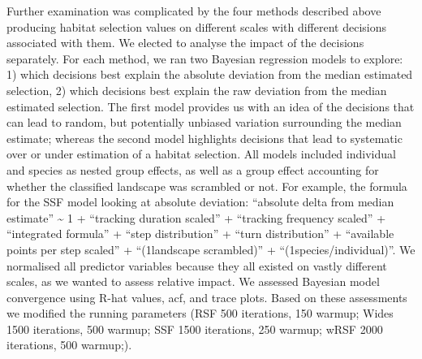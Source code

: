 \documentclass[10pt,a4paper]{article}
\begin{document}
Further examination was complicated by the four methods described above producing habitat selection values on different scales with different decisions associated with them.
We elected to analyse the impact of the decisions separately.
For each method, we ran two Bayesian regression models to explore: 1) which decisions best explain the absolute deviation from the median estimated selection, 2) which decisions best explain the raw deviation from the median estimated selection.
The first model provides us with an idea of the decisions that can lead to random, but potentially unbiased variation surrounding the median estimate; whereas the second model highlights decisions that lead to systematic over or under estimation of a habitat selection.
All models included individual and species as nested group effects, as well as a group effect accounting for whether the classified landscape was scrambled or not.
For example, the formula for the SSF model looking at absolute deviation: ``absolute delta from median estimate'' \textasciitilde{} 1 + ``tracking duration scaled'' + ``tracking frequency scaled'' + ``integrated formula'' + ``step distribution'' + ``turn distribution'' + ``available points per step scaled'' + ``(1\textbar landscape scrambled)'' + ``(1\textbar species/individual)''.
We normalised all predictor variables because they all existed on vastly different scales, as we wanted to assess relative impact.
We assessed Bayesian model convergence using R-hat values, acf, and trace plots.
Based on these assessments we modified the running parameters (RSF 500 iterations, 150 warmup; Wides 1500 iterations, 500 warmup; SSF 1500 iterations, 250 warmup; wRSF 2000 iterations, 500 warmup;).
\end{document}
